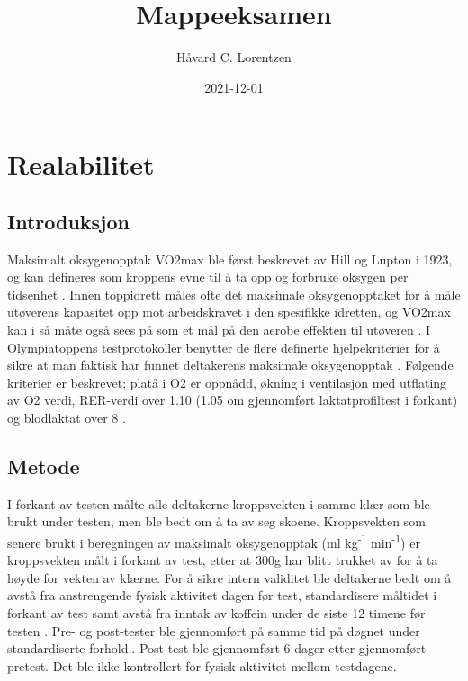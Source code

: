 \documentclass[
]{book}
\title{Mappeeksamen}
\author{Håvard C. Lorentzen}
\date{2021-12-01}
\begin{document}
\maketitle

{
\setcounter{tocdepth}{1}
\tableofcontents
}
\hypertarget{realabilitet}{%
\chapter{Realabilitet}\label{realabilitet}}

\hypertarget{introduksjon}{%
\section{Introduksjon}\label{introduksjon}}

Maksimalt oksygenopptak VO2max ble først beskrevet av Hill og Lupton i 1923, og kan defineres som kroppens evne til å ta opp og forbruke oksygen per tidsenhet \citep{bassett2000, hill1923}. Innen toppidrett måles ofte det maksimale oksygenopptaket for å måle utøverens kapasitet opp mot arbeidskravet i den spesifikke idretten, og VO2max kan i så måte også sees på som et mål på den aerobe effekten til utøveren \citep{bassett2000}. I Olympiatoppens testprotokoller benytter de flere definerte hjelpekriterier for å sikre at man faktisk har funnet deltakerens maksimale oksygenopptak \citep{tønnessen2017}. Følgende kriterier er beskrevet; platå i O2 er oppnådd, økning i ventilasjon med utflating av O2 verdi, RER-verdi over 1.10 (1.05 om gjennomført laktatprofiltest i forkant) og blodlaktat over 8 \citep{tønnessen2017}.

\hypertarget{metode}{%
\section{Metode}\label{metode}}

I forkant av testen målte alle deltakerne kroppsvekten i samme klær som ble brukt under testen, men ble bedt om å ta av seg skoene. Kroppsvekten som senere brukt i beregningen av maksimalt oksygenopptak (ml kg\textsuperscript{-1} min\textsuperscript{-1}) er kroppsvekten målt i forkant av test, etter at 300g har blitt trukket av for å ta høyde for vekten av klærne. For å sikre intern validitet ble deltakerne bedt om å avstå fra anstrengende fysisk aktivitet dagen før test, standardisere måltidet i forkant av test samt avstå fra inntak av koffein under de siste 12 timene før testen \citep{halperin2015} . Pre- og post-tester ble gjennomført på samme tid på døgnet under standardiserte forhold.. Post-test ble gjennomført 6 dager etter gjennomført pretest. Det ble ikke kontrollert for fysisk aktivitet mellom testdagene.
\end{document}
